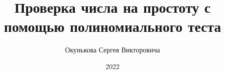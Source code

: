 \documentclass[spec, och, labwork]{shiza}
\begin{document}
\chair{}

\title{Проверка числа на простоту с помощью полиномиального теста}






\author{Окунькова Сергея Викторовича}








\date{2022}

\maketitle

\end{document}
